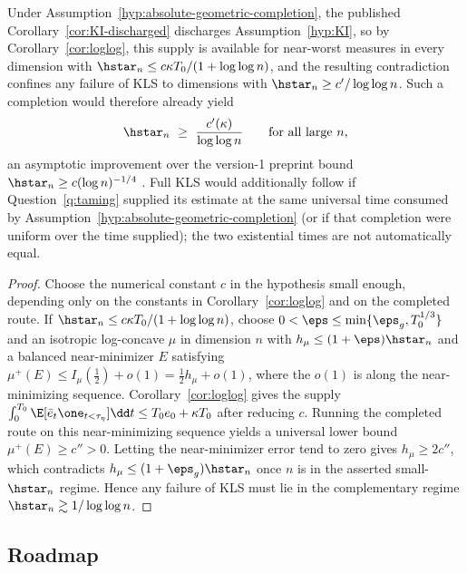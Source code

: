 \documentclass[../../main.tex]{subfiles}
\begin{document}
\begin{corollary}
\label{cor:dichotomy}
Under Assumption~\ref{hyp:absolute-geometric-completion}, the published
Corollary~\ref{cor:KI-discharged} discharges Assumption~\ref{hyp:KI}, so by
Corollary~\textup{\ref{cor:loglog}}, this supply is available for near-worst measures in every
dimension with $\hstar_n\le c\kappa T_0/(1+\log\log n)$, and the resulting contradiction
confines any failure of KLS to dimensions with $\hstar_n\ge c'/\log\log n$. Such a completion
would therefore already yield
\[
  \hstar_n\ \ge\ \frac{c'(\kappa)}{\log\log n}
  \qquad\text{for all large }n,
\]
an asymptotic improvement over the version-1 preprint bound
$\hstar_n\ge c(\log n)^{-1/4}$ \cite{Letwin2026QuadraticKLS}. Full KLS would additionally
follow if Question~\textup{\ref{q:taming}} supplied its estimate at the same universal time
consumed by Assumption~\textup{\ref{hyp:absolute-geometric-completion}} (or if that completion
were uniform over the time supplied); the two existential times are not automatically equal.
\end{corollary}

\begin{proof}
Choose the numerical constant $c$ in the hypothesis small enough, depending only on the constants
in Corollary~\ref{cor:loglog} and on the completed route. If
$\hstar_n\le c\kappa T_0/(1+\log\log n)$, choose
$0<\eps\le\min\{\eps_g,T_0^{1/3}\}$ and an isotropic log-concave $\mu$ in dimension $n$ with
$h_\mu\le(1+\eps)\hstar_n$ and a balanced near-minimizer $E$ satisfying
$\mu^+(E)\le I_\mu(\tfrac12)+o(1)=\tfrac12h_\mu+o(1)$, where the $o(1)$ is along the
near-minimizing sequence. Corollary~\ref{cor:loglog} gives the supply
$\int_0^{T_0}\E[\bar e_t\one_{t<\tau_\eta}]\dd t\le T_0e_0+\kappa T_0$ after reducing $c$.
Running the completed route on this near-minimizing sequence yields a universal lower bound
$\mu^+(E)\ge c''>0$. Letting the near-minimizer error tend to zero gives $h_\mu\ge2c''$, which
contradicts $h_\mu\le(1+\eps_g)\hstar_n$ once $n$ is in the asserted small-$\hstar_n$ regime. Hence any
failure of KLS must lie in the complementary regime $\hstar_n\gtrsim1/\log\log n$.
\end{proof}

\subsection{Roadmap}
\end{document}
